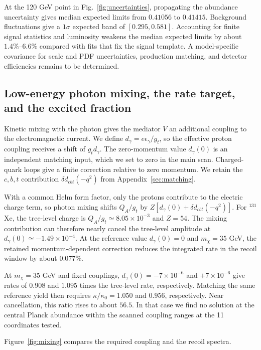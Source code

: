 \documentclass[aps,prd,reprint,superscriptaddress,longbibliography,floatfix]{revtex4-2}
\begin{document}
At the 120 GeV point in Fig.~\ref{fig:uncertainties}, propagating the abundance uncertainty gives median expected limits from $0.41056$ to $0.41415$. Background fluctuations give a $1\sigma$ expected band of $[0.295,0.581]$. Accounting for finite signal statistics and luminosity weakens the median expected limits by about $1.4\%$--$6.6\%$ compared with fits that fix the signal template. A model-specific covariance for scale and PDF uncertainties, production matching, and detector efficiencies remains to be determined.

\subsection{Low-energy photon mixing, the rate target, and the excited fraction}

\label{sec:low_energy}

Kinetic mixing with the photon gives the mediator $V$ an additional coupling to the electromagnetic current. We define $d_\gamma=e\epsilon_\gamma/g_t$, so the effective proton coupling receives a shift of $g_t d_\gamma$. The zero-momentum value $d_\gamma(0)$ is an independent matching input, which we set to zero in the main scan. Charged-quark loops give a finite correction relative to zero momentum. We retain the $c,b,t$ contribution $\delta d_{cbt}(-q^2)$ from Appendix~\ref{sec:matching}. \cite{deramo2016,forner2026}

With a common Helm form factor, only the protons contribute to the electric charge term, so photon mixing shifts $Q_A/g_t$ by $Z[d_\gamma(0)+\delta d_{cbt}(-q^2)]$. For $^{131}$Xe, the tree-level charge is $Q_A/g_t\simeq8.05\times10^{-3}$ and $Z=54$. The mixing contribution can therefore nearly cancel the tree-level amplitude at $d_\gamma(0)\simeq-1.49\times10^{-4}$. At the reference value $d_\gamma(0)=0$ and $m_\chi=35$ GeV, the retained momentum-dependent correction reduces the integrated rate in the recoil window by about $0.077\%$.

At $m_\chi=35$ GeV and fixed couplings, $d_\gamma(0)=-7\times10^{-6}$ and $+7\times10^{-6}$ give rates of $0.908$ and $1.095$ times the tree-level rate, respectively. Matching the same reference yield then requires $\kappa/\kappa_0=1.050$ and $0.956$, respectively. Near cancellation, this ratio rises to about $56.5$. In that case we find no solution at the central Planck abundance within the scanned coupling ranges at the 11 coordinates tested.

Figure~\ref{fig:mixing} compares the required coupling and the recoil spectra.
\end{document}
